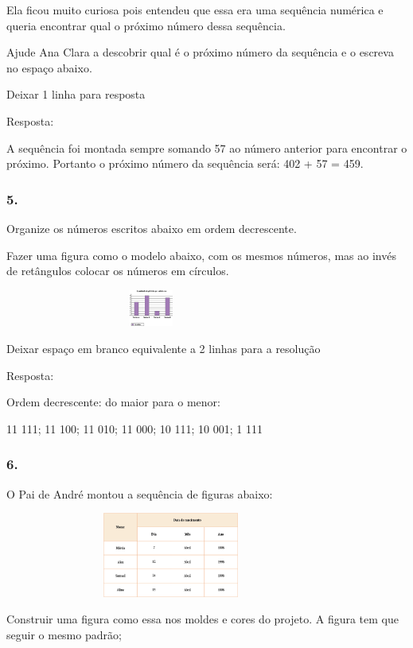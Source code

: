 Ela ficou muito curiosa pois entendeu que essa era uma sequência
numérica e queria encontrar qual o próximo número dessa sequência.

Ajude Ana Clara a descobrir qual é o próximo número da sequência e o
escreva no espaço abaixo.

Deixar 1 linha para resposta

Resposta:

A sequência foi montada sempre somando 57 ao número anterior para
encontrar o próximo. Portanto o próximo número da sequência será: 402 +
57 = 459.

\subsubsection{5.}\label{section-30}

Organize os números escritos abaixo em ordem decrescente.

Fazer uma figura como o modelo abaixo, com os mesmos números, mas ao
invés de retângulos colocar os números em círculos.

\includegraphics[width=3.79199in,height=0.47504in]{media/image44.png}

Deixar espaço em branco equivalente a 2 linhas para a resolução

Resposta:

Ordem decrescente: do maior para o menor:

11 111; 11 100; 11 010; 11 000; 10 111; 10 001; 1 111

\subsubsection{6.}\label{section-31}

O Pai de André montou a sequência de figuras abaixo:

\includegraphics[width=4.30871in,height=1.10010in]{media/image45.png}

Construir uma figura como essa nos moldes e cores do projeto. A figura
tem que seguir o mesmo padrão;

